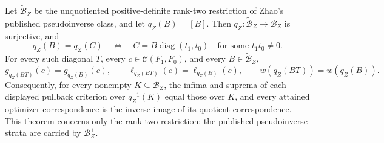 Let \(\widetilde{\mathcal B}_Z\) be the unquotiented positive-definite rank-two restriction of Zhao's published pseudoinverse class, and let \(q_Z(B)=[B]\).  Then \(q_Z:\widetilde{\mathcal B}_Z\to\mathcal B_Z\) is surjective, and
\[
q_Z(B)=q_Z(C)
\quad\Longleftrightarrow\quad
C=B\operatorname{diag}(t_1,t_0)
\quad\text{for some }t_1t_0\ne0.
\]
For every such diagonal \(T\), every \(c\in\mathcal C(F_1,F_0)\), and every \(B\in\widetilde{\mathcal B}_Z\),
\[
g_{q_Z(BT)}(c)=g_{q_Z(B)}(c),\qquad
\ell_{q_Z(BT)}(c)=\ell_{q_Z(B)}(c),\qquad
w(q_Z(BT))=w(q_Z(B)).
\]
Consequently, for every nonempty \(K\subseteq\mathcal B_Z\), the infima and suprema of each displayed pullback criterion over \(q_Z^{-1}(K)\) equal those over \(K\), and every attained optimizer correspondence is the inverse image of its quotient correspondence.  This theorem concerns only the rank-two restriction; the published pseudoinverse strata are carried by \(\mathcal B_Z^+\).
